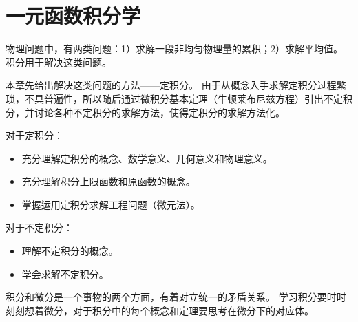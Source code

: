 \chapter{一元函数积分学}

物理问题中，有两类问题：1）求解一段非均匀物理量的累积；2）求解平均值。
积分用于解决这类问题。

本章先给出解决这类问题的方法——定积分。
由于从概念入手求解定积分过程繁琐，不具普遍性，所以随后通过微积分基本定理（牛顿莱布尼兹方程）引出不定积分，并讨论各种不定积分的求解方法，使得定积分的求解方法化。

对于定积分：
\begin{itemize}
    \item 充分理解定积分的概念、数学意义、几何意义和物理意义。
    \item 充分理解积分上限函数和原函数的概念。
    \item 掌握运用定积分求解工程问题（微元法）。
\end{itemize}

对于不定积分：
\begin{itemize}
    \item 理解不定积分的概念。
    \item 学会求解不定积分。
\end{itemize}

积分和微分是一个事物的两个方面，有着对立统一的矛盾关系。
学习积分要时时刻刻想着微分，对于积分中的每个概念和定理要思考在微分下的对应体。

\newpage


\newpage


\newpage


\newpage


\newpage


\newpage


\newpage


\newpage





